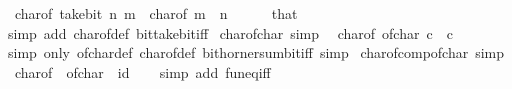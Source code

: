 \begin{isabellebody}
\ \ {\isacartoucheopen}char{\isacharunderscore}{\kern0pt}of\ {\isacharparenleft}{\kern0pt}take{\isacharunderscore}{\kern0pt}bit\ n\ m{\isacharparenright}{\kern0pt}\ {\isacharequal}{\kern0pt}\ char{\isacharunderscore}{\kern0pt}of\ m{\isacartoucheclose}\ \ {\isacartoucheopen}n\ {\isasymge}\ {}{\isacartoucheclose}\isanewline
%
\isadelimproof
\ \ %
\endisadelimproof
%
\isatagproof
{}\isamarkupfalse%
\ that\ \isamarkupfalse%
\ {\isacharparenleft}{\kern0pt}simp\ add{\isacharcolon}{\kern0pt}\ char{\isacharunderscore}{\kern0pt}of{\isacharunderscore}{\kern0pt}def\ bit{\isacharunderscore}{\kern0pt}take{\isacharunderscore}{\kern0pt}bit{\isacharunderscore}{\kern0pt}iff{\isacharparenright}{\kern0pt}%
\endisatagproof
{\isafoldproof}%
%
\isadelimproof
\isanewline
%
\endisadelimproof
\isanewline
{}\isamarkupfalse%
\ char{\isacharunderscore}{\kern0pt}of{\isacharunderscore}{\kern0pt}char\ {\isacharbrackleft}{\kern0pt}simp{\isacharbrackright}{\kern0pt}{\isacharcolon}{\kern0pt}\isanewline
\ \ {\isacartoucheopen}char{\isacharunderscore}{\kern0pt}of\ {\isacharparenleft}{\kern0pt}of{\isacharunderscore}{\kern0pt}char\ c{\isacharparenright}{\kern0pt}\ {\isacharequal}{\kern0pt}\ c{\isacartoucheclose}\isanewline
%
\isadelimproof
\ \ %
\endisadelimproof
%
\isatagproof
{}\isamarkupfalse%
\ {\isacharparenleft}{\kern0pt}simp\ only{\isacharcolon}{\kern0pt}\ of{\isacharunderscore}{\kern0pt}char{\isacharunderscore}{\kern0pt}def\ char{\isacharunderscore}{\kern0pt}of{\isacharunderscore}{\kern0pt}def\ bit{\isacharunderscore}{\kern0pt}horner{\isacharunderscore}{\kern0pt}sum{\isacharunderscore}{\kern0pt}bit{\isacharunderscore}{\kern0pt}iff{\isacharparenright}{\kern0pt}\ simp%
\endisatagproof
{\isafoldproof}%
%
\isadelimproof
\isanewline
%
\endisadelimproof
\isanewline
{}\isamarkupfalse%
\ char{\isacharunderscore}{\kern0pt}of{\isacharunderscore}{\kern0pt}comp{\isacharunderscore}{\kern0pt}of{\isacharunderscore}{\kern0pt}char\ {\isacharbrackleft}{\kern0pt}simp{\isacharbrackright}{\kern0pt}{\isacharcolon}{\kern0pt}\isanewline
\ \ {\isachardoublequoteopen}char{\isacharunderscore}{\kern0pt}of\ {\isasymcirc}\ of{\isacharunderscore}{\kern0pt}char\ {\isacharequal}{\kern0pt}\ id{\isachardoublequoteclose}\isanewline
%
\isadelimproof
\ \ %
\endisadelimproof
%
\isatagproof
{}\isamarkupfalse%
\ {\isacharparenleft}{\kern0pt}simp\ add{\isacharcolon}{\kern0pt}\ fun{\isacharunderscore}{\kern0pt}eq{\isacharunderscore}{\kern0pt}iff{\isacharparenright}{\kern0pt}%
\endisatagproof
{\isafoldproof}%
%
\isadelimproof

\end{isabellebody}
